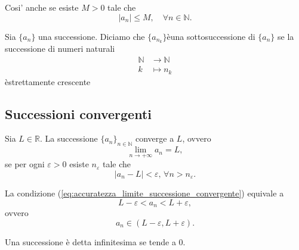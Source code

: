 Cosi' anche se esiste $M>0$ tale che
\begin{equation*}
    |a_n|\leq M,\quad \forall n\in\mathbb N.
\end{equation*}

\begin{definition}[Sottosucessione]\label{def:sottosuccessione}
    Sia $\{a_n\}$ una successione. Diciamo che $\{a_{n_k}\}$èuna
    sottosuccessione di $\{a_n\}$ se la successione di numeri naturali
    \begin{equation*}
        \begin{aligned}
            \mathbb N &\rightarrow\mathbb N\\
            k &\mapsto n_k
        \end{aligned}
    \end{equation*}
   èstrettamente crescente
\end{definition}

\subsection{Successioni convergenti}
\begin{definition}
    Sia $L\in\mathbb R$. La successione $\{a_n\}_{n\in\mathbb N}$ converge a $L$, ovvero
    \begin{equation*}
        \lim_{n\rightarrow+\infty}a_n=L,
    \end{equation*}
    se per ogni $\varepsilon>0$ esiste $n_\varepsilon$ tale che
    \begin{equation}\label{eq:accuratezza_limite_successione_convergente}
        |a_n-L|<\varepsilon,\,\forall n>n_\varepsilon.
    \end{equation}
\end{definition}

\begin{remark}\label{rem:successione_convergente_limitata}
    La condizione (\ref{eq:accuratezza_limite_successione_convergente}) equivale a
    \begin{equation*}
        L-\varepsilon < a_n < L+\varepsilon,
    \end{equation*}
    ovvero
    \begin{equation*}
        a_n\in(L-\varepsilon,L+\varepsilon).
    \end{equation*}
\end{remark}

\begin{definition}
    Una successione è detta infinitesima se tende a 0.
\end{definition}

